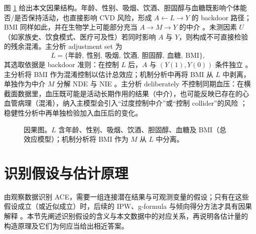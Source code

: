 \documentclass[12pt,a4paper]{article}
\begin{document}
图 \ref{fig:dag} 给出本文因果结构。年龄、性别、吸烟、饮酒、胆固醇与血糖既影响个体能否/是否保持活动，也直接影响 CVD 风险，形成 $A\leftarrow L\to Y$ 的 backdoor 路径；BMI 同样如此，并在生物学上可能部分充当 $A\to M\to Y$ 的中介 \cite{wang2023obesity,chen2023pa}。未测因素 $U$（如家族史、饮食模式、医疗可及性）若同时影响 $A$ 与 $Y$，则构成不可直接检验的残余混淆。主分析 adjustment set 为
\[
L=\{\text{年龄},\ \text{性别},\ \text{吸烟},\ \text{饮酒},\ \text{胆固醇},\ \text{血糖},\ \text{BMI}\},
\]
其选取依据是 backdoor 准则：在控制 $L$ 后，$A$ 与 $(Y(1),Y(0))$ 条件独立 \cite{hernan2024whatif,rosenbaum1983central}。主分析将 BMI 作为混淆控制以估计总效应；机制分析中再将 BMI 从 $L$ 中剥离，单独作为中介 $M$ 分解 NDE 与 NIE \cite{vanderweele2015explanation}。主分析 deliberately 不控制同期血压：在横截面数据里，血压既可能是活动长期作用的结果（中介），也可能反映已存在的心血管病理（混淆），纳入主模型会引入“过度控制中介”或“控制 collider”的风险 \cite{hernan2024whatif}；稳健性分析中再单独检验加入血压后的变化。

\begin{figure}[H]
\centering
{}
\caption{因果图。$L$ 含年龄、性别、吸烟、饮酒、胆固醇、血糖及 BMI（总效应模型）；机制分析将 BMI 作为 $M$ 从 $L$ 中分离。}
\label{fig:dag}
\end{figure}

\section{识别假设与估计原理}

由观察数据识别 ACE，需要一组连接潜在结果与可观测变量的假设；只有在这些假设成立（或近似成立）时，后续的 IPW、g-formula 与倾向得分方法才具有因果解释 \cite{hernan2024whatif}。本节先阐述识别假设的含义与本文数据中的对应关系，再说明各估计量的构造原理及它们为何应当给出相近答案。
\end{document}
